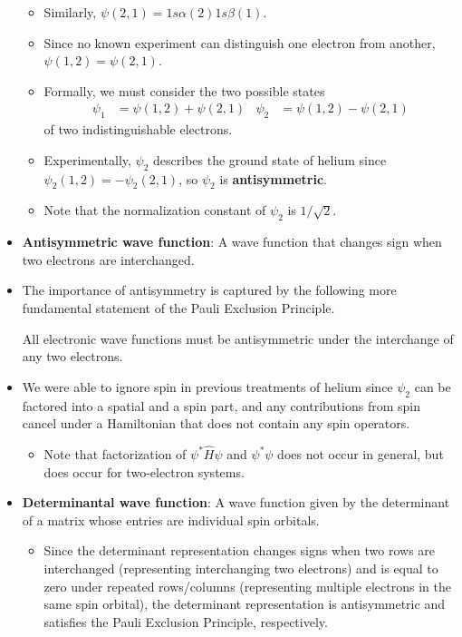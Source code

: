 \documentclass[../notes.tex]{subfiles}
\begin{document}
\begin{itemize}
\begin{itemize}
        \item Similarly, $\psi(2,1)=1s\alpha(2)1s\beta(1)$.
        \item Since no known experiment can distinguish one electron from another, $\psi(1,2)=\psi(2,1)$.
        \item Formally, we must consider the two possible states
        \begin{align*}
            \psi_1 &= \psi(1,2)+\psi(2,1)&
            \psi_2 &= \psi(1,2)-\psi(2,1)
        \end{align*}
        of two indistinguishable electrons.
        \item Experimentally, $\psi_2$ describes the ground state of helium since $\psi_2(1,2)=-\psi_2(2,1)$, so $\psi_2$ is \textbf{antisymmetric}.
        \item Note that the normalization constant of $\psi_2$ is $1/\sqrt{2}$.
    \end{itemize}
    \item \textbf{Antisymmetric wave function}: A wave function that changes sign when two electrons are interchanged.
    \item The importance of antisymmetry is captured by the following more fundamental statement of the Pauli Exclusion Principle.
    \begin{postulate}
        All electronic wave functions must be antisymmetric under the interchange of any two electrons.
    \end{postulate}
    \item We were able to ignore spin in previous treatments of helium since $\psi_2$ can be factored into a spatial and a spin part, and any contributions from spin cancel under a Hamiltonian that does not contain any spin operators.
    \begin{itemize}
        \item Note that factorization of $\psi^*\hat{H}\psi$ and $\psi^*\psi$ does not occur in general, but does occur for two-electron systems.
    \end{itemize}
    \item \textbf{Determinantal wave function}: A wave function given by the determinant of a matrix whose entries are individual spin orbitals.
    \begin{itemize}
        \item Since the determinant representation changes signs when two rows are interchanged (representing interchanging two electrons) and is equal to zero under repeated rows/columns (representing multiple electrons in the same spin orbital), the determinant representation is antisymmetric and satisfies the Pauli Exclusion Principle, respectively.

\end{itemize}
\end{itemize}
\end{document}
